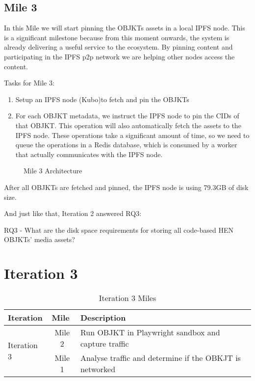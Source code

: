 \subsection {Mile 3}

In this Mile we will start pinning the OBJKTs assets in a local IPFS node. This is a significant milestone because from this moment onwards, the system is already delivering a useful service to the ecosystem. By pinning content and participating in the IPFS p2p network we are helping other nodes access the content.

Tasks for Mile 3:
\begin{enumerate}
	\item Setup an IPFS node (Kubo)\footnotemark[8] to fetch and pin the OBJKTs
	\item For each OBJKT metadata, we instruct the IPFS node to pin the CIDs of that OBJKT. This operation will also automatically fetch the assets to the IPFS node. These operations take a significant amount of time, so we need to queue the operations in a Redis database, which is consumed by a worker that actually communicates with the IPFS node.
\end{enumerate}




\begin{figure}[h]
    \centering
    
    \caption[Mile 3 Architecture]{Mile 3 Architecture}
    \label{fig:mile3-arch}
\end{figure}


After all OBJKTs are fetched and pinned, the IPFS node is using 79.3GB of disk size.


And just like that, Iteration 2 answered RQ3:

\vspace{0.5cm}
RQ3 - What are the disk space requirements for storing all code-based HEN OBJKTs’ media assets?
\vspace{0.5cm}

\section {Iteration 3}


\begin{table}[h]
\footnotesize
\centering
\begin{tabular}{|l|c|l|}
\hline
\textbf{Iteration}        & \multicolumn{1}{l|}{\textbf{Mile}} & \textbf{Description}                                         \\ \hline
\multirow{2}{*}{Iteration 3} & Mile 2                              & Run OBJKT in Playwright sandbox and capture traffic          \\ \cline{2-3} 
                             & Mile 1                              & Analyse traffic and determine if the OBKJT is networked      \\ \hline
\end{tabular}
\caption{Iteration 3 Miles}
\end{table}



